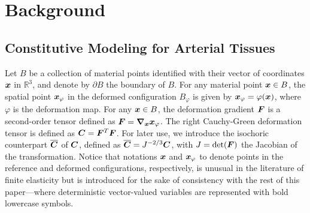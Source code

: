 \section{Background}
\label{sec:intro-background}
\subsection{Constitutive Modeling for Arterial Tissues}
\label{subsubsec:constitutive-modeling}
Let $B$ be a collection of material points identified with their vector of coordinates $\boldsymbol{x}$ in $\mathbb{R}^3$, and denote by $\partial B$ the boundary of $B$. For any material point $\boldsymbol{x} \in B$, the spatial point $\boldsymbol{x}_\varphi$ in the deformed configuration $B_\varphi$ is given by $\boldsymbol{x}_\varphi = \varphi (\boldsymbol{x})$, where $\varphi$ is the deformation map. For any $\boldsymbol{x} \in B$, the deformation gradient $\boldsymbol{F}$ is a second-order tensor defined as $\boldsymbol{F} = \boldsymbol{\nabla}_{\boldsymbol{x}} \boldsymbol{x}_\varphi$. The right Cauchy-Green deformation tensor is defined as $\boldsymbol{C} = \boldsymbol{F}^T \boldsymbol{F}$. For later use, we introduce the isochoric counterpart $\overline{\boldsymbol{C}}$ of $\boldsymbol{C}$, defined as $\overline{\boldsymbol{C}} = J^{-2/3}\boldsymbol{C}$, with $J = \det(\boldsymbol{F})$ the Jacobian of the transformation. Notice that notations $\boldsymbol{x}$ and $\boldsymbol{x}_\varphi$ to denote points in the reference and deformed configurations, respectively, is unusual in the literature of finite elasticity \cite{Ciarlet1988} but is introduced for the sake of consistency with the rest of this paper---where deterministic vector-valued variables are represented with bold lowercase symbols.

